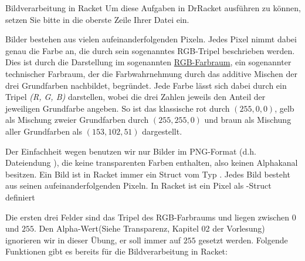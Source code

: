 \documentclass{../tuda-exercise}
\begin{document}
  \begin{task}[credit=\stars{3}{3}]{Bildverarbeitung in Racket}
    Um diese Aufgaben in DrRacket ausführen zu können, setzen Sie bitte  in die oberste Zeile Ihrer Datei ein.

    \br

    Bilder bestehen aus vielen aufeinanderfolgenden Pixeln. Jedes Pixel nimmt dabei genau die
    Farbe an, die durch sein sogenanntes RGB-Tripel beschrieben werden. Dies ist durch die
    Darstellung im sogenannten \href{https://de.wikipedia.org/wiki/RGB-Farbraum}{RGB-Farbraum},
    ein sogenannter technischer Farbraum, der die Farbwahrnehmung durch das additive Mischen der
    drei Grundfarben nachbildet, begründet. Jede Farbe lässt sich dabei durch ein Tripel \textit{
      (R, G, B)} darstellen, wobei die drei Zahlen jeweils den Anteil der jeweiligen Grundfarbe
    angeben. So ist das klassische rot durch \((255,0,0)\), gelb als Mischung zweier Grundfarben
    durch \((255,255,0)\) und braun als Mischung aller Grundfarben als \((153,102,51)\) dargestellt.

    \br

    Der Einfachheit wegen benutzen wir nur Bilder im PNG-Format (d.h. Dateiendung ), die keine transparenten Farben enthalten,  also keinen Alphakanal besitzen. Ein
    Bild ist in Racket immer ein Struct vom Typ
    . Jedes Bild besteht aus seinen aufeinanderfolgenden Pixeln. In Racket
    ist ein Pixel als -Struct definiert

    

    Die ersten drei Felder sind das Tripel des RGB-Farbraums und liegen zwischen \(0\) und \(255\).
    Den Alpha-Wert(Siehe Transparenz, Kapitel 02 der Vorlesung) ignorieren wir in dieser Übung,
    er soll immer auf \(255\) gesetzt werden. Folgende Funktionen gibt es bereits für die
    Bildverarbeitung in Racket:


\end{task}
\end{document}
